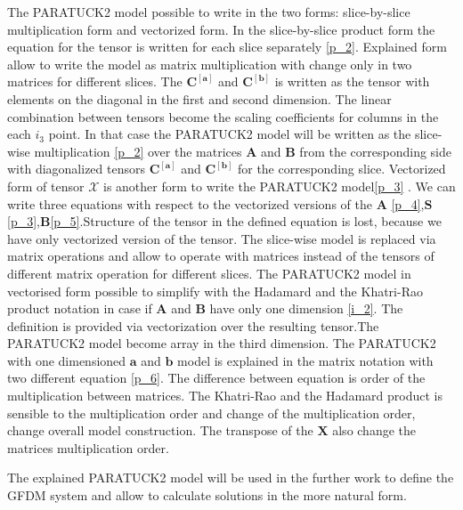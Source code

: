 The PARATUCK2 model possible to write in the two forms: slice-by-slice multiplication form and vectorized form.
In the  slice-by-slice product form the equation for the tensor is written for each slice separately \eqref{p_2}. Explained form allow to write the model as matrix multiplication with change only in two matrices for different slices.  The $\mathbf{C^{[a]}}$ and $\mathbf{C^{[b]}}$ is written as the tensor with elements on the diagonal in the first and second dimension. The linear combination between tensors become the scaling coefficients for columns in the each $i_3$ point. In that case the PARATUCK2 model will be written as the slice-wise multiplication \eqref{p_2} over the matrices $\mathbf{A} $ and $\mathbf{B} $ from the corresponding side with diagonalized tensors $\mathbf{C^{[a]}}$ and $\mathbf{C^{[b]}}$ for the corresponding slice\cite{Book12}.
Vectorized form of tensor $\mathcal{X}$ is another form to write the PARATUCK2 model\eqref{p_3} . We can write three equations with respect to the vectorized versions of the $\mathbf{A}$ \eqref{p_4},$\mathbf{S}$\eqref{p_3},$\mathbf{B}$\eqref{p_5}\cite{Book26}.Structure of the tensor in the defined equation is lost,  because we have only vectorized version of the tensor. The slice-wise model is replaced via matrix operations and allow to operate with matrices instead of the tensors of different matrix operation for different slices\cite{Book26}.
 The PARATUCK2 model in vectorised form possible to simplify with the Hadamard and the Khatri-Rao product notation in case if $\mathbf{A}$ and $\mathbf{B}$ have only one dimension \eqref{i_2}. The definition is provided via vectorization over the resulting tensor.The PARATUCK2 model become array in the third dimension.    The PARATUCK2 with one dimensioned $\mathbf{a}$ and $\mathbf{b}$  model is explained in the matrix notation with two different equation  \eqref{p_6}\cite{Book26}. The difference between equation is order of the multiplication between matrices. The Khatri-Rao and the Hadamard product is sensible to the multiplication order and change of the multiplication order, change overall model construction. The transpose of the $\mathbf{X}$ also change the matrices multiplication order.

The explained PARATUCK2 model will be used in the further work to define the GFDM system and allow to calculate solutions in the more natural form.
